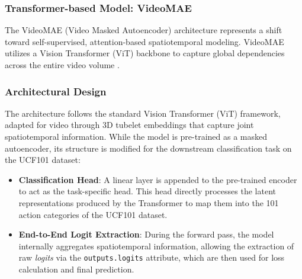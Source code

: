 \subsubsection{Transformer-based Model: VideoMAE}

The VideoMAE (Video Masked Autoencoder) architecture represents a shift toward self-supervised, attention-based spatiotemporal modeling. VideoMAE utilizes a Vision Transformer (ViT) backbone to capture global dependencies across the entire video volume \cite{Tong2022}. 

\subsubsection*{Architectural Design}
The architecture follows the standard Vision Transformer (ViT) framework, adapted for video through 3D tubelet embeddings that capture joint spatiotemporal information. While the model is pre-trained as a masked autoencoder, its structure is modified for the downstream classification task on the UCF101 dataset:

\begin{itemize}
    \item \textbf{Classification Head}: A linear layer is appended to the pre-trained encoder to act as the task-specific head. This head directly processes the latent representations produced by the Transformer to map them into the 101 action categories of the UCF101 dataset.
    \item \textbf{End-to-End Logit Extraction}: During the forward pass, the model internally aggregates spatiotemporal information, allowing the extraction of raw \textit{logits} via the \texttt{outputs.logits} attribute, which are then used for loss calculation and final prediction.
\end{itemize}